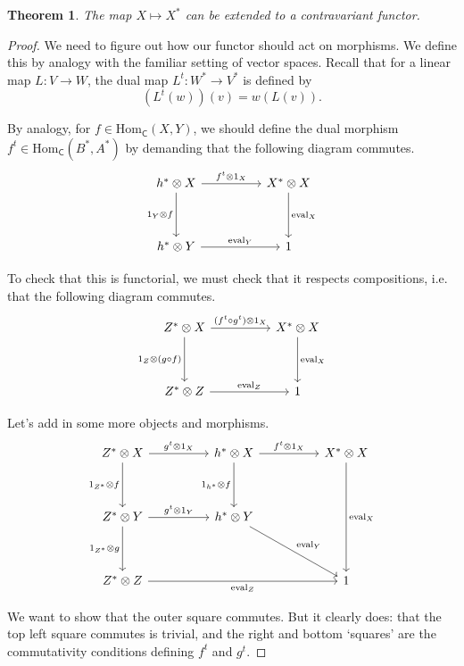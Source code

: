 \documentclass[a4paper,10pt]{scrreprt}
\newcommand{\Hom}{\mathrm{Hom}}
\newcommand{\ev}{\mathrm{eval}}
\theoremstyle{definition}
\theoremstyle{plain}
\newtheorem{theorem}{Theorem}[section]
\theoremstyle{remark}
\begin{document}
\begin{theorem}
  The map $X \mapsto X^{*}$ can be extended to a contravariant functor.
\end{theorem}
\begin{proof}
  We need to figure out how our functor should act on morphisms. We define this by analogy with the familiar setting of vector spaces. Recall that for a linear map $L\colon V \to W$, the dual map $L^{t}\colon W^{*} \to V^{*}$ is defined by
  \begin{equation*}
    (L^{t}(w))(v) = w(L(v)).
  \end{equation*}

  By analogy, for $f \in \Hom_{\mathsf{C}}(X, Y)$, we should define the dual morphism $f^{t} \in \Hom_{\mathsf{C}}(B^{*}, A^{*})$ by demanding that the following diagram commutes.
  \begin{equation*}
    \begin{tikzcd}[row sep=huge, column sep=huge]
      h^{*} \otimes X
      \arrow[r, "f^{t} \otimes 1_{X}"]
      \arrow[d, swap, "1_{Y} \otimes f"]
      & X^{*} \otimes X
      \arrow[d, "\ev_{X}"]
      \\
      h^{*} \otimes Y
      \arrow[r, "\ev_{Y}"]
      & 1
    \end{tikzcd}
  \end{equation*}

  To check that this is functorial, we must check that it respects compositions, i.e. that the following diagram commutes.
  \begin{equation*}
    \begin{tikzcd}[row sep=huge, column sep=huge]
      Z^{*} \otimes X
      \arrow[r, "(f^{t} \circ g^{t}) \otimes 1_{X}"]
      \arrow[d, swap, "1_{Z} \otimes (g \circ f)"]
      & X^{*} \otimes X
      \arrow[d, "\ev_{X}"]
      \\
      Z^{*} \otimes Z
      \arrow[r, "\ev_{Z}"]
      & 1
    \end{tikzcd}
  \end{equation*}

  Let's add in some more objects and morphisms.
  \begin{equation*}
    \begin{tikzcd}[row sep=huge, column sep=huge]
      Z^{*} \otimes X
      \arrow[r, "g^{t} \otimes 1_{X}"]
      \arrow[d, swap, "1_{Z^{*}} \otimes f"]
      & h^{*} \otimes X
      \arrow[r, "f^{t} \otimes 1_{X}"]
      \arrow[d, swap, "1_{h^{*}} \otimes f"]
      & X^{*} \otimes X
      \arrow[dd, "\ev_{X}"]
      \\
      Z^{*} \otimes Y
      \arrow[r, "g^{t} \otimes 1_{Y}"]
      \arrow[d, swap, "1_{Z^{*}} \otimes g"]
      & h^{*} \otimes Y
      \arrow[dr, "\ev_{Y}"]
      \\
      Z^{*} \otimes Z
      \arrow[rr, swap, "\ev_{Z}"]
      & & 1
    \end{tikzcd}
  \end{equation*}

  We want to show that the outer square commutes. But it clearly does: that the top left square commutes is trivial, and the right and bottom `squares' are the commutativity conditions defining $f^{t}$ and $g^{t}$.
\end{proof}
\end{document}
